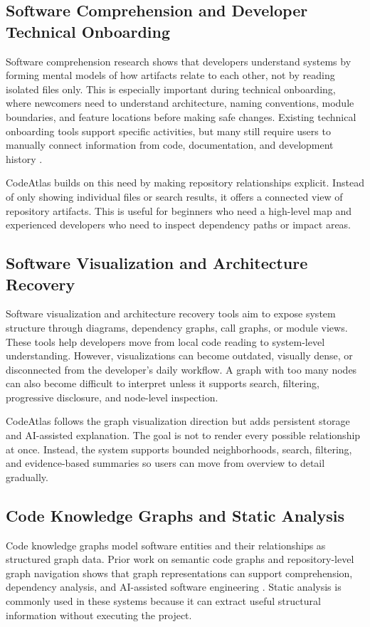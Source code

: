 \documentclass[conference]{IEEEtran}
\begin{document}
\subsection{Software Comprehension and Developer Technical Onboarding}
Software comprehension research shows that developers understand systems by forming mental models of how artifacts relate to each other, not by reading isolated files only. This is especially important during technical onboarding, where newcomers need to understand architecture, naming conventions, module boundaries, and feature locations before making safe changes. Existing technical onboarding tools support specific activities, but many still require users to manually connect information from code, documentation, and development history \cite{santos2024onboarding}.

CodeAtlas builds on this need by making repository relationships explicit. Instead of only showing individual files or search results, it offers a connected view of repository artifacts. This is useful for beginners who need a high-level map and experienced developers who need to inspect dependency paths or impact areas.

\subsection{Software Visualization and Architecture Recovery}
Software visualization and architecture recovery tools aim to expose system structure through diagrams, dependency graphs, call graphs, or module views. These tools help developers move from local code reading to system-level understanding. However, visualizations can become outdated, visually dense, or disconnected from the developer's daily workflow. A graph with too many nodes can also become difficult to interpret unless it supports search, filtering, progressive disclosure, and node-level inspection.

CodeAtlas follows the graph visualization direction but adds persistent storage and AI-assisted explanation. The goal is not to render every possible relationship at once. Instead, the system supports bounded neighborhoods, search, filtering, and evidence-based summaries so users can move from overview to detail gradually.

\subsection{Code Knowledge Graphs and Static Analysis}
Code knowledge graphs model software entities and their relationships as structured graph data. Prior work on semantic code graphs and repository-level graph navigation shows that graph representations can support comprehension, dependency analysis, and AI-assisted software engineering \cite{semanticcodegraph, codexgraph, repograph}. Static analysis is commonly used in these systems because it can extract useful structural information without executing the project.
\end{document}
